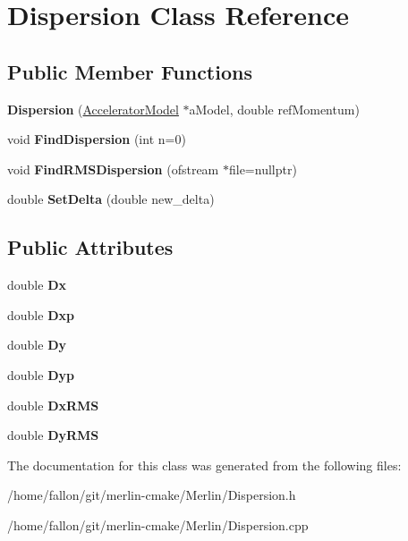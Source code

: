 \hypertarget{classDispersion}{}\section{Dispersion Class Reference}
\label{classDispersion}
\subsection*{Public Member Functions}
\begin{DoxyCompactItemize}
\item 
\mbox{\label{classDispersion_ada11ee98a456d0771489a38a7bbb5089}} 
{\bfseries Dispersion} (\hyperlink{classAcceleratorModel}{Accelerator\+Model} $\ast$a\+Model, double ref\+Momentum)
\item 
\mbox{\label{classDispersion_a38ddd6464b864201c419885427e6efcb}} 
void {\bfseries Find\+Dispersion} (int n=0)
\item 
\mbox{\label{classDispersion_a2c2dc96248506bffec89596a4c1e20e0}} 
void {\bfseries Find\+R\+M\+S\+Dispersion} (ofstream $\ast$file=nullptr)
\item 
\mbox{\label{classDispersion_a89f3e942913a0ebb5364f2b0e542e228}} 
double {\bfseries Set\+Delta} (double new\+\_\+delta)
\end{DoxyCompactItemize}
\subsection*{Public Attributes}
\begin{DoxyCompactItemize}
\item 
\mbox{\label{classDispersion_a59a3d8faa785ae15c685d7ee40c4e5ac}} 
double {\bfseries Dx}
\item 
\mbox{\label{classDispersion_a02e36e2131952e8f748235c5e6ff8169}} 
double {\bfseries Dxp}
\item 
\mbox{\label{classDispersion_a04b2faddfe2fd639bb66cf2f2d6476b4}} 
double {\bfseries Dy}
\item 
\mbox{\label{classDispersion_a14da8ca178ea8bcb5e856a6995078b87}} 
double {\bfseries Dyp}
\item 
\mbox{\label{classDispersion_ab4fa7fd69dd9ec3b6356681ab05b8624}} 
double {\bfseries Dx\+R\+MS}
\item 
\mbox{\label{classDispersion_a80a1aeac15e980fed8a0d3aa4d1a6bd9}} 
double {\bfseries Dy\+R\+MS}
\end{DoxyCompactItemize}


The documentation for this class was generated from the following files\+:\begin{DoxyCompactItemize}
\item 
/home/fallon/git/merlin-\/cmake/\+Merlin/Dispersion.\+h\item 
/home/fallon/git/merlin-\/cmake/\+Merlin/Dispersion.\+cpp\end{DoxyCompactItemize}
